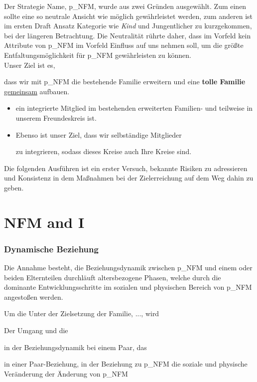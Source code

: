 \begin{itemize}
Der Strategie Name, \gls{p_NFM}, wurde aus zwei Gründen ausgewählt. Zum einen sollte eine so neutrale Ansicht wie möglich gewährleistet werden, zum anderen ist im ersten Draft Ansatz Kategorie wie \textit{Kind} und Jungentlicher zu kurzgekommen, bei der längeren Betrachtung. Die Neutralität rührte daher, dass im Vorfeld kein Attribute von \gls{p_NFM} im Vorfeld Einfluss auf uns nehmen soll, um die größte Entfaltungsmöglichkeit für \gls{p_NFM} gewährleisten zu können.\\


Unser Ziel ist es,
\begin{center}
dass wir mit \gls{p_NFM} die bestehende Familie erweitern und eine \textbf{tolle Familie} \underline{gemeinsam} aufbauen.	
\end{center}


\begin{itemize}
	\item ein integrierte Mitglied im bestehenden  erweiterten Familien- und teilweise in unserem Freundeskreis ist.
	\item Ebenso ist unser Ziel, dass wir selbständige Mitglieder  
	
	zu integrieren, sodass dieses Kreise auch Ihre Kreise sind.
\end{itemize}

Die folgenden Ausführen ist ein erster Versuch, bekannte Risiken zu adressieren und  Konsistenz in dem Maßnahmen bei der Zielerreichung auf dem Weg dahin zu geben.


\section{NFM and I}

\subsubsection{Dynamische Beziehung}
Die Annahme besteht, die Beziehungsdynamik zwischen \gls{p_NFM} und einem oder beiden Elternteilen durchläuft altersbezogene Phasen, welche durch die dominante Entwicklungsschritte im sozialen und physischen Bereich von \gls{p_NFM} angestoßen werden.

Um die 
Unter der Zielsetzung der Familie, ..., wird 

Der Umgang und die 

 in der Beziehungsdynamik bei einem Paar, das 

in einer Paar-Beziehung, in der Beziehung zu \gls{p_NFM} die soziale und physische Veränderung  der Änderung von \gls{p_NFM} 



\end{itemize}
